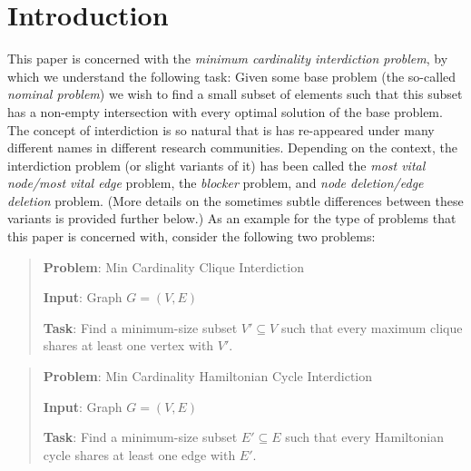 \section{Introduction}

This paper is concerned with the \emph{minimum cardinality interdiction problem}, by which we understand the following task: Given some base problem (the so-called \emph{nominal problem}) we wish to find a small subset of elements such that this subset has a non-empty intersection with every optimal solution of the base problem.
The concept of interdiction is so natural that is has re-appeared under many different names in different research communities. 
Depending on the context, the interdiction problem (or slight variants of it) has been called the \emph{most vital node/most vital edge} problem, the \emph{blocker} problem, and \emph{node deletion/edge deletion} problem. (More details on the sometimes subtle differences between these variants is provided further below.)
As an example for the type of problems that this paper is concerned with, consider the following two problems:
\begin{quote}
    \textbf{Problem}: {\sc Min Cardinality Clique Interdiction}

    \textbf{Input}: Graph $G = (V, E)$

    \textbf{Task}: Find a minimum-size subset $V' \subseteq V$ such that every maximum clique shares at least one vertex with $V'$. 
\end{quote}

\begin{quote}
    \textbf{Problem}: {\sc Min Cardinality Hamiltonian Cycle Interdiction}

    \textbf{Input}: Graph $G = (V, E)$

    \textbf{Task}: Find a minimum-size subset $E' \subseteq E$ such that every Hamiltonian cycle shares at least one edge with $E'$.
\end{quote}

